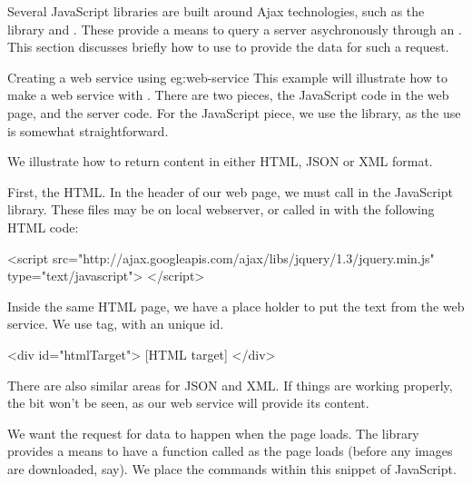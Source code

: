 Several JavaScript libraries are built around Ajax technologies, such
as the  library and . These provide a means to query a server
asychronously through an . This section discusses
briefly how to use  to provide the data for such a
request. 

\begin{example}{Creating a web service using }{eg:web-service}
  This example will illustrate how to make a web service with
  . There are two pieces, the JavaScript code in the web
  page, and the server code. For the JavaScript piece, we use the
   library, as the use is somewhat straightforward.
  
  We illustrate how to return content in either HTML, JSON or XML format. 
  
  First, the HTML. In the header of our web page, we must call in the
   JavaScript library. These files may be on local
  webserver, or called in with the following HTML code:
  \begin{HTMLinput}
<script 
  src="http://ajax.googleapis.com/ajax/libs/jquery/1.3/jquery.min.js" 
  type="text/javascript">
</script>    
  \end{HTMLinput}

  Inside the same HTML page, we have a place holder to put the text from
  the web service. We use  tag, with an unique id.
  \begin{HTMLinput}
<div id="htmlTarget"> [HTML target] </div>    
  \end{HTMLinput}
  There are also similar areas for JSON and XML. If things are working
  properly, the bit  won't be seen, as our web
  service will provide its content.
  
  We want the request for data to happen when the page loads. The
   library provides a means to have a function called as
  the page loads (before any images are downloaded, say). We place the
  commands within this snippet of JavaScript.


\end{example}
